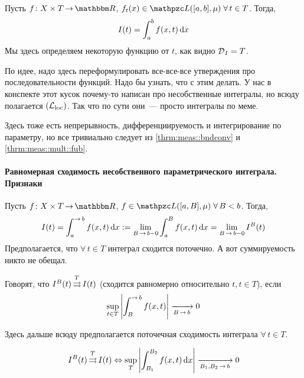 \documentclass[draft, timbord]{longnotes}
\begin{document}
\begin{defn}\label{defn:meas::paruniconv::prop}
  Пусть $f\colon X \times T \to \R$, $f_t(x)\in \summb([a,b],\mu) \; \forall\, t \in T$. 
  Тогда, 
  \[
    I(t) = \int_a^{b} f(x,t) \, \mathrm{d} x 
  \]
  Мы здесь определяем некоторую функцию от $t$, как видно $\operatorname{\mathcal D}_I = T$.
\end{defn}

По идее, надо здесь переформулировать все-все-все утверждения про последовательности функций.
Надо бы узнать, что с этим делать.
\flame 
У нас в конспекте этот кусок почему-то написан про несобственные интегралы, но всюду полагается
$(\mathcal L_{\rm loc})$. Так что по сути они~--- просто интегралы по меме.

Здесь тоже есть непрерывность, дифференциируемость и интегрирование по параметру, но
все тривиально следует из \ref{thrm:meas::bndconv} и \ref{thrm:meas::mult::fub}.

\paragraph{Равномерная сходимость несобственного параметрического интеграла. Признаки}
\label{par:meas::paruniconv}


\begin{defn}\label{defn:meas::paruniconv::improp}
  Пусть $f\colon X \times T \to \R$,
  $f\in \summb([a,B],\mu) \;\forall\, B <b$. Тогда,
  \[
    I(t) = \int_a^{\to b} f(x,t) \, \del x := \lim_{B\to b-0} \int_a^B f(x,t) \, \del x 
    = \lim_{B\to b-0} I^B(t)
  \]
  Предполагается, что $\forall\, t \in T$ интеграл сходится поточечно. А вот суммируемость
  никто не обещал.
\end{defn}


\begin{defn}\label{defn:meas::paruniconv::uniconv}
  Говорят, что $I^B(t) \mathop{\rightrightarrows}\limits^T I(t)$ (сходится равномерно относительно $t, t\in T$), если 
  \[
    \sup_{t\in T} \left| \int_B^{\to b} f(x,t)\right| \xto{B\to b} 0
  \]
\end{defn}

Здесь дальше всюду предполагается поточечная сходимость интеграла $\forall\, t \in T$.

\begin{thrm}\label{thrm:meas::paruniconv::bk}
  \[
    I^B(t) \unito^T I(t) \Leftrightarrow 
    \sup_{T} \left| \int_{B_1}^{B_2} f(x,t)\, \del x \right| \xto{B_1, B_2 \to b} 0
  \]
\end{thrm}
\end{document}
